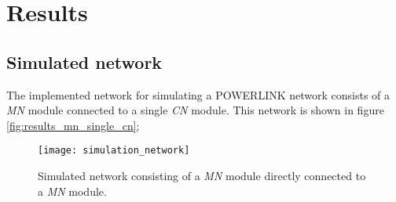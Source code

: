 \chapter{Results}
\label{cha:results}

\section{Simulated network}
\label{sec:results_network}
The implemented network for simulating a POWERLINK network consists of a \emph{MN} module connected to a single \emph{CN} module.
This network is shown in figure \ref{fig:results_mn_single_cn};

\begin{figure}
    \centering
    \texttt{[image: simulation\_network]}
    \caption{Simulated network consisting of a \emph{MN} module directly connected to a \emph{MN} module.}
    \label{fig:simulation_network}
\end{figure}
